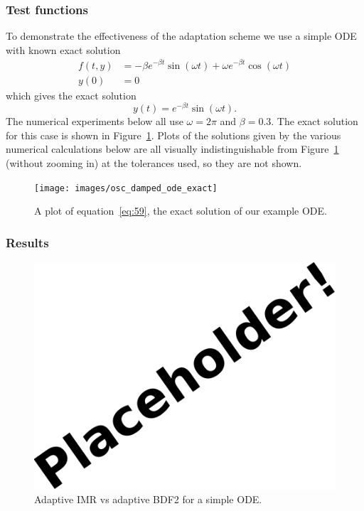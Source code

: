 \subsubsection{Test functions}

To demonstrate the effectiveness of the adaptation scheme we use a simple ODE with known exact solution
\begin{align}
  f(t,y) &= - \beta e^{-\beta t} \sin(\omega t) + \omega e^{-\beta t} \cos(\omega t) \\
  y(0) &= 0
\end{align}
which gives the exact solution
\begin{equation}
  \label{eq:59}
  y(t) = e^{-\beta t} \sin(\omega t).
\end{equation}
The numerical experiments below all use $\omega = 2 \pi$ and $\beta = 0.3$.
The exact solution for this case is shown in Figure~\ref{fig:mp-ode-exact}.
Plots of the solutions given by the various numerical calculations below are all visually indistinguishable from Figure~\ref{fig:mp-ode-exact} (without zooming in) at the tolerances used, so they are not shown.


\begin{figure}[ht!]
  \centering
  \texttt{[image: images/osc\_damped\_ode\_exact]}
  \caption{A plot of equation~\eqref{eq:59}, the exact solution of our example ODE.}
  \label{fig:mp-ode-exact}
\end{figure}

\subsubsection{Results}

\begin{figure}[ht!]
  \centering
  \includegraphics{images/placeholder}
  \caption{Adaptive IMR vs adaptive BDF2 for a simple ODE.}
  \label{fig:mp-vs-bdf2}
\end{figure}


